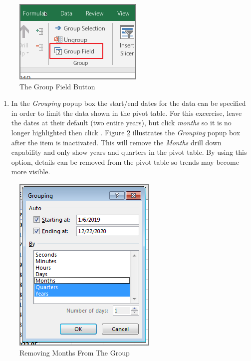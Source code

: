 \begin{figure}[H]
	\centering
	\includegraphics[width=\maxwidth{.50\linewidth}]{gfx/ch07_fig23}
	\caption{The Group Field Button}
	\label{07:fig23}
\end{figure}

\begin{enumerate}[resume]
	\item In the \textit{Grouping} popup box the start/end dates for the data can be specified in order to limit the data shown in the pivot table. For this excercise, leave the dates at their default (two entire years), but click \textit{months} so it is no longer highlighted then click . Figure \ref{07:fig24} illustrates the \textit{Grouping} popup box after the  item is inactivated. This will remove the \textit{Months} drill down capability and only show years and quarters in the pivot table. By using this option, details can be removed from the pivot table so trends may become more visible.
\end{enumerate}

\begin{figure}[H]
	\centering
	\includegraphics[width=\maxwidth{.60\linewidth}]{gfx/ch07_fig24}
	\caption{Removing Months From The Group}
	\label{07:fig24}
\end{figure}


